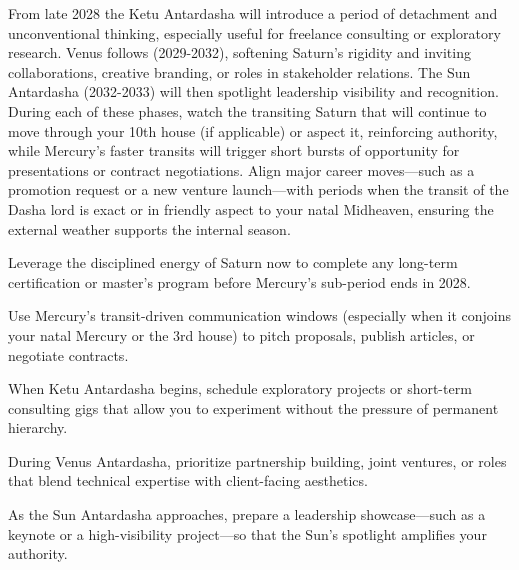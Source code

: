 {\fontsize{9}{13}\selectfont From late 2028 the Ketu Antardasha will introduce a period of detachment and unconventional thinking, especially useful for freelance consulting or exploratory research. Venus follows (2029-2032), softening Saturn's rigidity and inviting collaborations, creative branding, or roles in stakeholder relations. The Sun Antardasha (2032-2033) will then spotlight leadership visibility and recognition. During each of these phases, watch the transiting Saturn that will continue to move through your 10th house (if applicable) or aspect it, reinforcing authority, while Mercury's faster transits will trigger short bursts of opportunity for presentations or contract negotiations. Align major career moves---such as a promotion request or a new venture launch---with periods when the transit of the Dasha lord is exact or in friendly aspect to your natal Midheaven, ensuring the external weather supports the internal season.}\par\vspace{1.8mm}

\begin{diamondlist}
  \item {\fontsize{8.5}{12}\selectfont Leverage the disciplined energy of Saturn now to complete any long-term certification or master's program before Mercury's sub-period ends in 2028.}
  \item {\fontsize{8.5}{12}\selectfont Use Mercury's transit-driven communication windows (especially when it conjoins your natal Mercury or the 3rd house) to pitch proposals, publish articles, or negotiate contracts.}
  \item {\fontsize{8.5}{12}\selectfont When Ketu Antardasha begins, schedule exploratory projects or short-term consulting gigs that allow you to experiment without the pressure of permanent hierarchy.}
  \item {\fontsize{8.5}{12}\selectfont During Venus Antardasha, prioritize partnership building, joint ventures, or roles that blend technical expertise with client-facing aesthetics.}
  \item {\fontsize{8.5}{12}\selectfont As the Sun Antardasha approaches, prepare a leadership showcase---such as a keynote or a high-visibility project---so that the Sun's spotlight amplifies your authority.}
\end{diamondlist}


